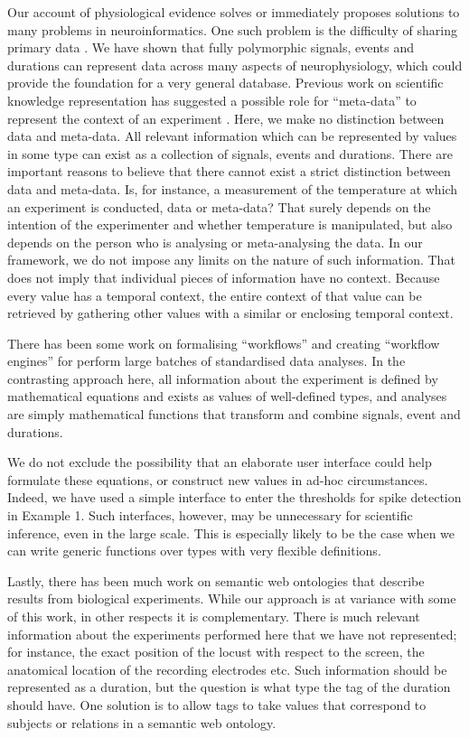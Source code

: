 Our account of physiological evidence solves or immediately proposes
solutions to many problems in neuroinformatics. One such problem is
the difficulty of sharing primary data \citep{Amari2002}. We have
shown that fully polymorphic signals, events and durations can
represent data across many aspects of neurophysiology, which could
provide the foundation for a very general database. Previous work on
scientific knowledge representation has suggested a possible role for
``meta-data'' to represent the context of an experiment
\citep{Bower2009}. Here, we make no distinction between data and
meta-data. All relevant information which can be represented by values
in some type can exist as a collection of signals, events and
durations. There are important reasons to believe that there cannot
exist a strict distinction between data and meta-data. Is, for
instance, a measurement of the temperature at which an experiment is
conducted, data or meta-data?  That surely depends on the intention of
the experimenter and whether temperature is manipulated, but also
depends on the person who is analysing or meta-analysing the data. In
our framework, we do not impose any limits on the nature of such
information. That does not imply that individual pieces of information
have no context. Because every value has a temporal context, the
entire context of that value can be retrieved by gathering other
values with a similar or enclosing temporal context.

There has been some work on formalising ``workflows'' and creating
``workflow engines'' for perform large batches of standardised data
analyses. In the contrasting approach here, all information about the
experiment is defined by mathematical equations and exists as values
of well-defined types, and analyses are simply mathematical functions
that transform and combine signals, event and durations.

We do not exclude the possibility that an elaborate user interface
could help formulate these equations, or construct new values in
ad-hoc circumstances. Indeed, we have used a simple interface to enter
the thresholds for spike detection in Example 1. Such interfaces,
however, may be unnecessary for scientific inference, even in the
large scale. This is especially likely to be the case when we can
write generic functions over types with very flexible definitions.

Lastly, there has been much work on semantic web ontologies that
describe results from biological experiments. While our approach is at
variance with some of this work, in other respects it is 
complementary. There is much relevant information about the
experiments performed here that we have not represented; for instance,
the exact position of the locust with respect to the screen, the anatomical
location of the recording electrodes etc. Such information should be
represented as a duration, but the question is what type the tag of
the duration should have. One solution is to allow tags to take values
that correspond to subjects or relations in a semantic web ontology.

